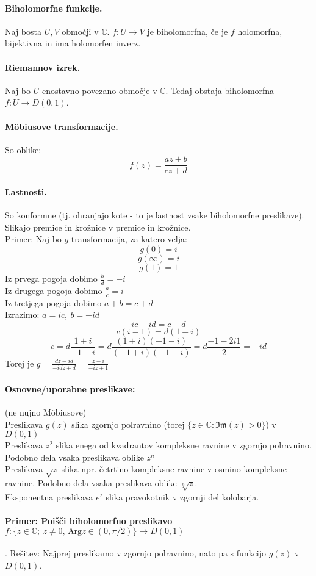 \documentclass[a4paper]{article}
\newcommand{\C}{\mathbb{C}}
\newcommand{\fn}[3]{{#1}\colon {#2} \rightarrow {#3}}
\begin{document}
\paragraph{Biholomorfne funkcije.} Naj bosta $U, V$ območji v $\C$. $\fn{f}{U}{V}$ je biholomorfna, če je $f$ holomorfna, bijektivna in ima holomorfen inverz.
\paragraph{Riemannov izrek.} Naj bo $U$ enostavno povezano območje v $\C$. Tedaj obstaja biholomorfna $\fn{f}{U}{D(0, 1)}$.
\paragraph{Möbiusove transformacije.} So oblike:
$$f(z) = \frac{az + b}{cz + d}$$
\paragraph{Lastnosti.} So konformne (tj. ohranjajo kote - to je lastnost vsake biholomorfne preslikave). Slikajo premice in krožnice v premice in krožnice. \\
Primer: Naj bo $g$ transformacija, za katero velja:
$$g(0) = i$$
$$g(\infty) = i$$
$$g(1) = 1$$
Iz prvega pogoja dobimo $\displaystyle{\frac{b}{d} = -i}$ \\
Iz drugega pogoja dobimo $\displaystyle{\frac{a}{c} = i}$ \\
Iz tretjega pogoja dobimo $\displaystyle{a + b = c + d}$ \\
Izrazimo: $\displaystyle{a = ic,~b = -id}$
$$ic - id = c + d$$
$$c(i-1) = d(1+i)$$
$$c = d\frac{1+i}{-1+i} = d\frac{(1+i)(-1-i)}{(-1+i)(-1-i)} = d\frac{-1 - 2i 1}{2} = -id$$
Torej je $\displaystyle{g = \frac{dz - id}{-idz + d} = \frac{z - i}{-iz + 1}}$
\paragraph{Osnovne/uporabne preslikave:}  (ne nujno Möbiusove) \\[3mm]
Preslikava $g(z)$ slika zgornjo polravnino (torej $\{z \in \C: \mathfrak{Im}(z) > 0\}$) v $D(0, 1)$ \\
Preslikava $z^2$ slika enega od kvadrantov kompleksne ravnine v zgornjo polravnino.
Podobno dela vsaka preslikava oblike $z^n$ \\
Preslikava $\sqrt{z}$ slika npr. četrtino kompleksne ravnine v osmino kompleksne ravnine. Podobno dela vsaka preslikava oblike $\displaystyle{\sqrt[n]{z}}$. \\
Eksponentna preslikava $e^z$ slika pravokotnik v zgornji del kolobarja.
\paragraph{Primer: Poišči biholomorfno preslikavo $\fn{f}{\{z \in \C;~z \neq 0,\,\text{Arg}z\in(0,\pi/2)\}}{D(0, 1)}$}.
Rešitev: Najprej preslikamo v zgornjo polravnino, nato pa s funkcijo $g(z)$ v $D(0, 1)$.
\end{document}
